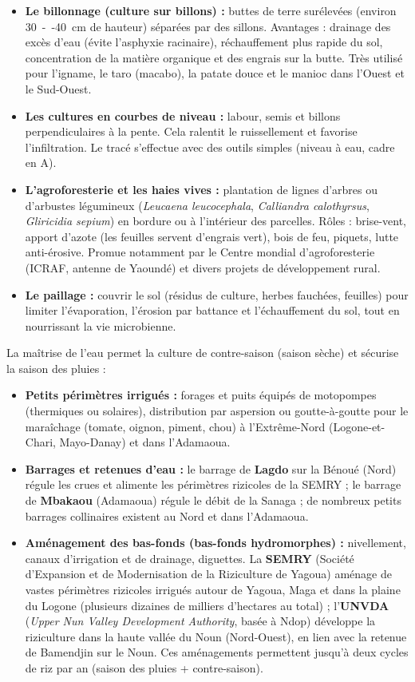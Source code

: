 \documentclass[11pt]{article}
\newcommand{\cle}[1]{{\popxbold\color{popdark}#1}}
\begin{document}
\begin{itemize}
    \item \textbf{Le billonnage (culture sur billons) :} buttes de terre surélevées (environ \SI{30}{--}\SI{40}{cm} de hauteur) séparées par des sillons. Avantages : drainage des excès d'eau (évite l'asphyxie racinaire), réchauffement plus rapide du sol, concentration de la matière organique et des engrais sur la butte. Très utilisé pour l'igname, le taro (macabo), la patate douce et le manioc dans l'Ouest et le Sud-Ouest.
    \item \textbf{Les cultures en courbes de niveau :} labour, semis et billons perpendiculaires à la pente. Cela ralentit le ruissellement et favorise l'infiltration. Le tracé s'effectue avec des outils simples (niveau à eau, cadre en A).
    \item \textbf{L'agroforesterie et les haies vives :} plantation de lignes d'arbres ou d'arbustes légumineux (\emph{Leucaena leucocephala}, \emph{Calliandra calothyrsus}, \emph{Gliricidia sepium}) en bordure ou à l'intérieur des parcelles. Rôles : brise-vent, apport d'azote (les feuilles servent d'engrais vert), bois de feu, piquets, lutte anti-érosive. Promue notamment par le Centre mondial d'agroforesterie (ICRAF, antenne de Yaoundé) et divers projets de développement rural.
    \item \textbf{Le paillage :} couvrir le sol (résidus de culture, herbes fauchées, feuilles) pour limiter l'évaporation, l'érosion par battance et l'échauffement du sol, tout en nourrissant la vie microbienne.
\end{itemize}

\noindent La \cle{maîtrise de l'eau} permet la \cle{culture de contre-saison} (saison sèche) et sécurise la saison des pluies :
\begin{itemize}
    \item \textbf{Petits périmètres irrigués :} forages et puits équipés de motopompes (thermiques ou solaires), distribution par aspersion ou goutte-à-goutte pour le maraîchage (tomate, oignon, piment, chou) à l'Extrême-Nord (Logone-et-Chari, Mayo-Danay) et dans l'Adamaoua.
    \item \textbf{Barrages et retenues d'eau :} le barrage de \textbf{Lagdo} sur la Bénoué (Nord) régule les crues et alimente les périmètres rizicoles de la SEMRY ; le barrage de \textbf{Mbakaou} (Adamaoua) régule le débit de la Sanaga ; de nombreux petits barrages collinaires existent au Nord et dans l'Adamaoua.
    \item \textbf{Aménagement des bas-fonds (bas-fonds hydromorphes) :} nivellement, canaux d'irrigation et de drainage, diguettes. La \textbf{SEMRY} (Société d'Expansion et de Modernisation de la Riziculture de Yagoua) aménage de vastes périmètres rizicoles irrigués autour de Yagoua, Maga et dans la plaine du Logone (plusieurs dizaines de milliers d'hectares au total) ; l'\textbf{UNVDA} (\emph{Upper Nun Valley Development Authority}, basée à Ndop) développe la riziculture dans la haute vallée du Noun (Nord-Ouest), en lien avec la retenue de Bamendjin sur le Noun. Ces aménagements permettent jusqu'à deux cycles de riz par an (saison des pluies + contre-saison).
\end{itemize}
\end{document}
